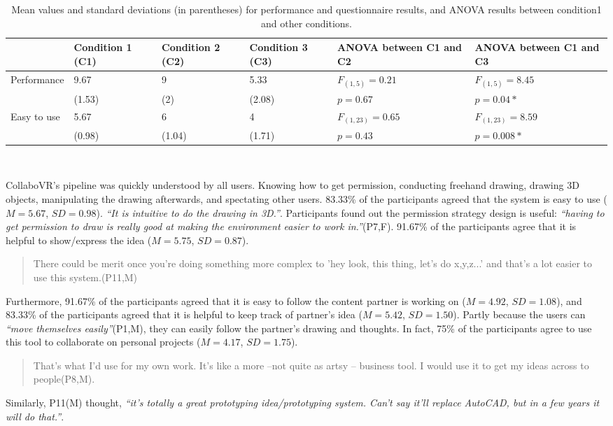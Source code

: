 \documentclass{sigchi}
\begin{document}
\begin{table}
  \centering
  \begin{tabular}{l C{2.2cm} C{2.25cm} C{2.15cm} C{2.8cm} C{2.8cm} }
    & Condition 1 (C1) & Condition 2 (C2) & Condition 3 (C3) & ANOVA between C1 and C2 & ANOVA between C1 and C3 \\
    \midrule
    Performance & 9.67 & 9 & 5.33 & $F_{(1,5)} = 0.21$ & $F_{(1,5)} =8.45$ \\
     & (1.53) & (2) & (2.08) & $p = 0.67$ & $p = 0.04*$\\
    Easy to use & 5.67 & 6 & 4 & $F_{(1,23)}=0.65$  & $F_{(1,23)}=8.59$\\
     & (0.98) & (1.04) & (1.71) & $p=0.43$ & $p=0.008*$\\
  \end{tabular}
  \caption{Mean values and standard deviations (in parentheses) for performance and questionnaire results, and ANOVA results between condition1 and other conditions.}~\label{tab:result}
\end{table}

CollaboVR's pipeline was quickly understood by all users. Knowing how to get permission, conducting freehand drawing, drawing 3D objects, manipulating the drawing afterwards, and spectating other users. 83.33\% of the participants agreed that the system is easy to use ($M=5.67$, $SD=0.98$). \textit{``It is intuitive to do the drawing in 3D.''}. Participants found out the permission strategy design is useful: \textit{``having to get permission to draw is really good at making the environment easier to work in.''}(P7,F).
91.67\% of the participants agree that it is helpful to show/express the idea ($M=5.75$, $SD=0.87$). 
\begin{quote}
    There could be merit once you're doing something more complex to 'hey look, this thing, let's do x,y,z...' and that's a lot easier to use this system.(P11,M)    
\end{quote}
Furthermore, 91.67\% of the participants agreed that it is easy to follow the content partner is working on ($M=4.92$, $SD=1.08$), and 83.33\% of the participants agreed that it is helpful to keep track of partner's idea ($M=5.42$, $SD=1.50$). Partly because the users can \textit{``move themselves easily''}(P1,M), they can easily follow the partner's drawing and thoughts.
In fact, 75\% of the participants agree to use this tool to collaborate on personal projects ($M=4.17$, $SD=1.75$). 
\begin{quote}
    That's what I'd use for my own work. It's like a more --not quite as artsy -- business tool. I would use it to get my ideas across to people(P8,M).
\end{quote}
Similarly, P11(M) thought, \textit{``it's totally a great prototyping idea/prototyping system. Can't say it'll replace AutoCAD, but in a few years it will do that.''}.
\end{document}
